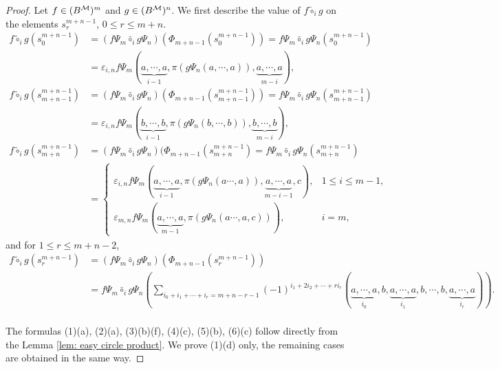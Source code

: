 \documentclass[10pt, reqno]{amsart}
\theoremstyle{definition}
\theoremstyle{remark}
\numberwithin{equation}{section}
\begin{document}
\begin{proof}
Let  \(f\in (B^{\mathcal{M}})^m \) and \(g\in (B^{\mathcal{M}})^n\). We first describe the value of \(f\tilde{\circ}_i g\) on the elements \(s_r^{m+n-1}\), \(0\le r \le m+n\). 
\[\begin{aligned}
    f \tilde{\circ}_i g(s_0^{m+n-1}) &=(f\Psi_m \bar{\circ}_i g\Psi_n)(\Phi_{m+n-1}(s_0^{m+n-1}))=f\Psi_m \bar{\circ}_i g\Psi_n(s_0^{m+n-1})\\
&=\varepsilon_{i,n}f\Psi_m(\underbrace{a,\cdots,a}_{i-1},\pi(g\Psi_n(a,\cdots,a)),\underbrace{a,\cdots,a}_{m-i}),\\
     f \tilde{\circ}_i g(s_{m+n-1}^{m+n-1})&=(f\Psi_m \bar{\circ}_i g\Psi_n)(\Phi_{m+n-1}(s_{m+n-1}^{m+n-1}))=f\Psi_m \bar{\circ}_i g\Psi_n(s_{m+n-1}^{m+n-1}) \\ 
     &= \varepsilon_{i,n}f\Psi_m(\underbrace{b,\cdots,b}_{i-1},\pi(g\Psi_n(b, \cdots, b)),\underbrace{b,\cdots,b}_{m-i}),\\
      f \tilde{\circ}_i g(s_{m+n}^{m+n-1})&=(f\Psi_m \bar{\circ}_i g\Psi_n)(\Phi_{m+n-1}(s_{m+n}^{m+n-1})=f\Psi_m \bar{\circ}_i g\Psi_n(s_{m+n}^{m+n-1}) \\ 
     &= \begin{cases}
         \varepsilon_{i,n}f\Psi_m(\underbrace{a,\cdots,a}_{i-1},\pi(g\Psi_n(a\cdots,a)),\underbrace{a,\cdots,a}_{m-i-1},c),  & 1\le i\le m-1,\\
        \varepsilon_{m,n}f\Psi_m(\underbrace{a,\cdots,a}_{m-1},\pi(g\Psi_n(a\cdots,a,c))),&i=m,
     \end{cases}
\end{aligned}
\]
and for \(1\le r \le m+n-2\),
\[\begin{aligned}
    f \tilde{\circ}_i g(s_r^{m+n-1}) &=(f\Psi_m \bar{\circ}_i g\Psi_n)(\Phi_{m+n-1}(s_r^{m+n-1})) \\
    &=f\Psi_m \bar{\circ}_i g\Psi_n(\sum_{i_0+i_1+\cdots+i_r=m+n-r-1}(-1)^{i_1+2i_2+\cdots+ri_r}(\underbrace{a,\cdots,a}_{i_0},b,\underbrace{a,\cdots,a}_{i_1},b,\cdots,b,\underbrace{a,\cdots,a}_{i_r})).\\     
\end{aligned}\]

The formulas (1)(a), (2)(a), (3)(b)(f), (4)(c), (5)(b), (6)(c) follow directly from the Lemma \ref{lem: easy circle product}. We prove (1)(d) only, the remaining cases are obtained in the same way.
    

\end{proof}
\end{document}
